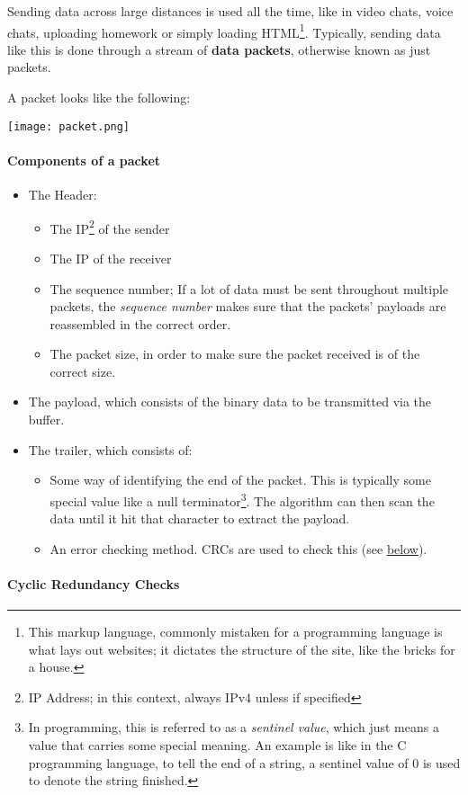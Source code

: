 \documentclass[../main.tex]{subfiles}
\begin{document}
Sending data across large distances is used all the time, like in video chats, voice chats, uploading homework or simply loading HTML\footnote{This markup language, commonly mistaken for a programming language is what lays out websites; it dictates the structure of the site, like the bricks for a house.}. Typically, sending data like this is done through a stream of \textbf{data packets}, otherwise known as just packets.

A packet looks like the following:

\texttt{[image: packet.png]}

\newpage

\paragraph{Components of a packet}

\begin{itemize}
    \item The Header:
        \begin{itemize}
            \item The IP\footnote{IP Address; in this context, always IPv4 unless if specified} of the sender
            \item The IP of the receiver
            \item The sequence number; If a lot of data must be sent throughout multiple packets, the
                  \emph{sequence number} makes sure that the packets' payloads are reassembled in the correct order.
            \item The packet size, in order to make sure the packet received is of the correct size.
        \end{itemize}
    \item The payload, which consists of the binary data to be transmitted via the buffer.
    \item The trailer, which consists of:
        \begin{itemize}
            \item Some way of identifying the end of the packet. This is typically some special value like a null terminator\footnote{In programming,
                  this is referred to as a \emph{sentinel value}, which just means a value that carries some special meaning. An example is like in the
                  C programming language, to tell the end of a string, a sentinel value of 0 is used to denote the string finished.}. The algorithm can
                  then scan the data until it hit that character to extract the payload.
            \item An error checking method. CRCs are used to check this (see \hyperref[par:CRCs]{below}).
        \end{itemize}
\end{itemize}

\label{par:CRCs} %
\paragraph{Cyclic Redundancy Checks}
\end{document}
